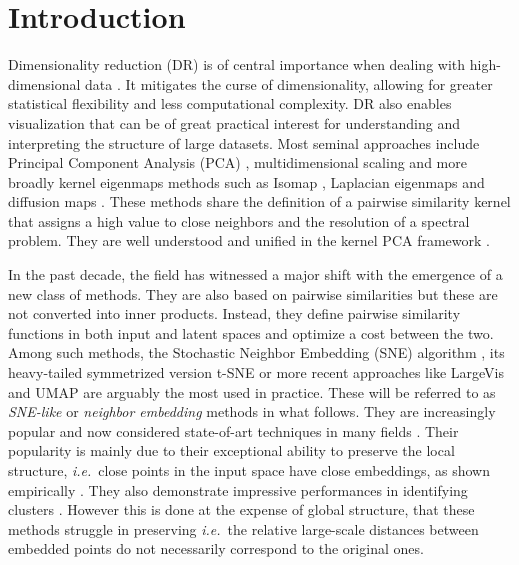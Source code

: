\section{Introduction}\label{intro}

Dimensionality reduction (DR) is of central importance when dealing with high-dimensional data \citep{donoho2000high}. It mitigates the curse of dimensionality, allowing for greater statistical flexibility and less computational complexity. DR also enables visualization that can be of great practical interest for understanding and interpreting the structure of large datasets.
Most seminal approaches include Principal Component Analysis (PCA) \cite{pearson1901liii},  multidimensional scaling \cite{kruskal1978multidimensional} and more broadly kernel eigenmaps methods such as Isomap \cite{balasubramanian2002isomap}, Laplacian eigenmaps \citep{belkin2003laplacian} and diffusion maps \citep{coifman2006diffusion}. These methods share the definition of a pairwise similarity kernel that assigns a high value to close neighbors and the resolution of a spectral problem. They are well understood and unified in the kernel PCA framework \citep{ham2004kernel}.

In the past decade, the field has witnessed a major shift with the emergence of a new class of methods. They are also based on pairwise similarities but these are not converted into inner products. Instead, they define pairwise similarity functions in both input and latent spaces and optimize a cost between the two. Among such methods, the Stochastic Neighbor Embedding (SNE) algorithm \cite{NIPS2002SNE}, its heavy-tailed symmetrized version t-SNE \cite{maaten2008tSNE} or more recent approaches like LargeVis \cite{tang2016visualizing} and UMAP \cite{mcinnes2018umap} are arguably the most used in practice. These will be referred to as \textit{SNE-like} or \textit{neighbor embedding} methods in what follows. They are increasingly popular and now considered state-of-art techniques in many fields \cite{li2017application,kobak2019art,anders2018dissecting}. Their popularity is mainly due to their exceptional ability to preserve the local structure, \textit{i.e.}\ close points in the input space have close embeddings, as shown empirically \cite{wang2021understanding}. They also demonstrate impressive performances in identifying clusters \cite{arora2018analysis, linderman2019clustering}. However this is done at the expense of global structure, that these methods struggle in preserving \cite{wattenberg2016use, coenen2019understanding} \textit{i.e.}\ the relative large-scale distances between embedded points do not necessarily correspond to the original ones. 

